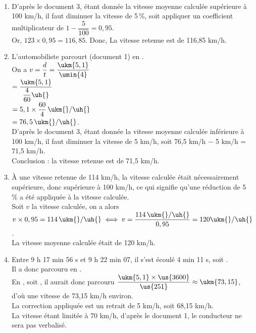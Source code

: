 \ \\ [-5mm]
   \begin{enumerate}
      \item D'après le document 3, étant donnée la vitesse moyenne calculée supérieure à 100 km/h, il faut diminuer la vitesse de 5\,\%, soit appliquer un coefficient multiplicateur de $1-\dfrac{5}{100} =0,95$. \\ [1mm]
         Or, $123\times0,95 =116,85$. Donc, {\blue La vitesse retenue est de 116,85 km/h}.
      \item L'automobiliste parcourt  (document 1) en . \\ [1mm]
         On a $v =\dfrac{d}{t} =\dfrac{\ukm{5,1}}{\umin{4}}$ \\ [2mm]
         \hspace*{17mm} $=\dfrac{\ukm{5,1}}{\dfrac{4}{60}\uh{}}$ \\ [1mm]
         \hspace*{17mm} $=5,1\times\dfrac{60}{4}\,\ukm{}/\uh{}$ \\ [1mm]
         \hspace*{17mm} $=76,5\,\ukm{}/\uh{}$. \\ [1mm]
         D'après le document 3, étant donnée la vitesse moyenne calculée inférieure à 100 km/h, il faut diminuer la vitesse de 5 km/h, soit 76,5 km/h $-$ 5 km/h = 71,5 km/h. \\
         Conclusion : {\blue la vitesse retenue est de 71,5 km/h}.
      \item À une vitesse retenue de 114 km/h, la vitesse calculée était nécessairement supérieure, donc supérieure à 100 km/h, ce qui signifie qu'une réduction de 5\,\% a été appliquée à la vitesse calculée. \\ [1mm]
         Soit $v$ la vitesse calculée, on a alors $v\times0,95 =114\,\ukm{}/\uh{} \iff v =\dfrac{114\,\ukm{}/\uh{}}{0,95} =120\ukm{}/\uh{}$. \\
         {\blue La vitesse moyenne calculée était de 120 km/h}.
      \item Entre 9 h 17 min 56 s et 9 h 22 min 07, il s'est écoulé 4 min 11 s, soit . \\
         Il a donc parcouru  en . \\
         En , soit , il aurait donc parcouru $\dfrac{\ukm{5,1}\times\us{3600}}{\us{251}} \approx\ukm{73,15}$, d'où une vitesse de 73,15 km/h environ. \\
         La correction appliquée est un retrait de 5 km/h, soit 68,15 km/h. \\
         La vitesse étant limitée à 70 km/h, d'après le document 1, {\blue le conducteur ne sera pas verbalisé}.
   \end{enumerate}
